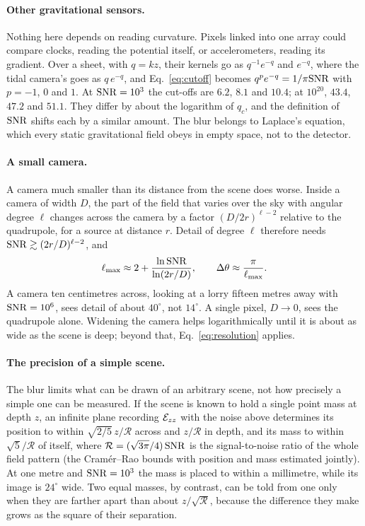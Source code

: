 \paragraph{Other gravitational sensors.} Nothing here depends on reading
curvature. Pixels linked into one array could compare clocks, reading the
potential itself, or accelerometers, reading its gradient. Over a sheet, with
$q = kz$, their kernels go as $q^{-1}e^{-q}$ and $e^{-q}$, where the tidal camera's goes as
$q\,e^{-q}$, and Eq.~\eqref{eq:cutoff} becomes $q^p e^{-q} = 1/\pi\mathrm{SNR}$ with
$p = -1$, $0$ and $1$. At $\mathrm{SNR} = 10^3$ the cut-offs are $6.2$, $8.1$ and
$10.4$; at $10^{20}$, $43.4$, $47.2$ and $51.1$. They differ by about the
logarithm of $q_c$, and the definition of $\mathrm{SNR}$ shifts each by a similar
amount. The blur belongs to Laplace's equation, which every static
gravitational field obeys in empty space, not to the detector.

\paragraph{A small camera.} A camera much smaller than its distance from
the scene does worse. Inside a camera of width $D$, the part of the field that
varies over the sky with angular degree $\ell$ changes across the camera by a
factor $(D/2r)^{\ell-2}$ relative to the quadrupole, for a source at distance
$r$. Detail of degree $\ell$ therefore needs $\mathrm{SNR} \gtrsim (2r/D)^{\ell-2}$, and
\begin{equation}\label{eq:handheld}
\ell_{\max} \approx 2 + \frac{\ln\mathrm{SNR}}{\ln(2r/D)}, \qquad
\Delta\theta \approx \frac{\pi}{\ell_{\max}} .
\end{equation}
A camera ten centimetres across, looking at a lorry fifteen metres away with
$\mathrm{SNR} = 10^6$, sees detail of about $40^\circ$, not $14^\circ$. A single pixel,
$D \to 0$, sees the quadrupole alone. Widening the camera helps logarithmically
until it is about as wide as the scene is deep; beyond that,
Eq.~\eqref{eq:resolution} applies.

\paragraph{The precision of a simple scene.} The blur limits what
can be drawn of an arbitrary scene, not how precisely a simple one can be
measured. If the scene is known to hold a single point mass at depth $z$, an
infinite plane recording $\mathcal{E}_{zz}$ with the noise above determines its
position to within $\sqrt{2/5}\,z/\mathcal{R}$ across and $z/\mathcal{R}$ in
depth, and its mass to within $\sqrt5/\mathcal{R}$ of itself, where
$\mathcal{R} = (\sqrt{3\pi}/4)\,\mathrm{SNR}$ is the signal-to-noise ratio of the whole
field pattern (the Cram\'er--Rao bounds with position and mass estimated
jointly). At one metre and $\mathrm{SNR} = 10^3$ the mass is placed to within a
millimetre, while its image is $24^\circ$ wide. Two equal masses, by contrast,
can be told from one only when they are farther apart than about
$z/\sqrt{\mathcal{R}}$, because the difference they make grows as the square
of their separation.

